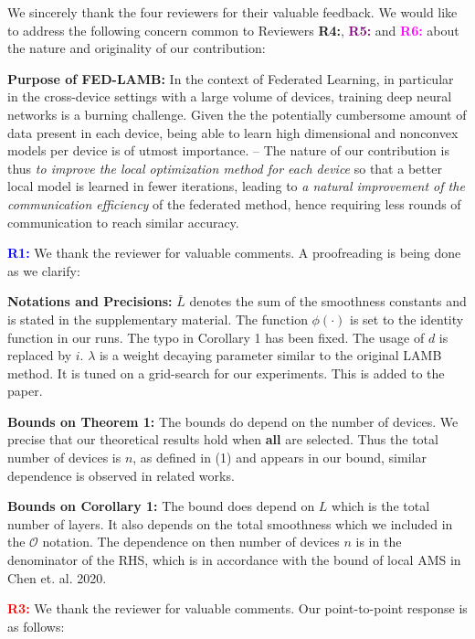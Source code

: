 \documentclass{article}
\begin{document}
We sincerely thank the four reviewers for their valuable feedback. We would like to address the following concern common to Reviewers \textbf{\textcolor{green!50!black}{R4:}}, \textbf{\textcolor{purple}{R5:}} and \textbf{\textcolor{magenta}{R6:}} about the nature and originality of our contribution:

\textbf{Purpose of FED-LAMB:} 
In the context of Federated Learning, in particular in the cross-device settings with a large volume of devices, training deep neural networks is a burning challenge.
Given the the potentially cumbersome amount of data present in each device, being able to learn high dimensional and nonconvex models per device is of utmost importance.
-- The nature of our contribution is thus \emph{to improve the local optimization method for each device} so that a better local model is learned in fewer iterations, leading to \emph{a natural improvement of the communication efficiency} of the federated method, hence requiring less rounds of communication to reach similar accuracy.

\textbf{\textcolor{blue}{R1:}} We thank the reviewer for valuable comments. A proofreading is being done as we clarify:


\textbf{Notations and Precisions:} 
$\bar{L}$ denotes the sum of the smoothness constants and is stated in the supplementary material. The function $\phi(\cdot)$ is set to the identity function in our runs. The typo in Corollary 1 has been fixed.
The usage of $d$ is replaced by $i$.
$\lambda$ is a weight decaying parameter similar to the original LAMB method. It is tuned on a grid-search for our experiments. This is added to the paper.

\textbf{Bounds on Theorem 1:} The bounds do depend on the number of devices.
We precise that our theoretical results hold when \textbf{all} are selected. Thus the total number of devices is $n$, as defined in (1) and appears in our bound, similar dependence is observed in related works.
 
\textbf{Bounds on Corollary 1:} The bound does depend on $L$ which is the total number of layers. It also depends on the total smoothness which we included in the $\mathcal{O}$ notation.
The dependence on then number of devices $n$ is in the denominator of the RHS, which is in accordance with the bound of local AMS in Chen et. al. 2020.


\textbf{\textcolor{red}{R3:}} We thank the reviewer for valuable comments.  Our point-to-point response is as follows: 
\end{document}
